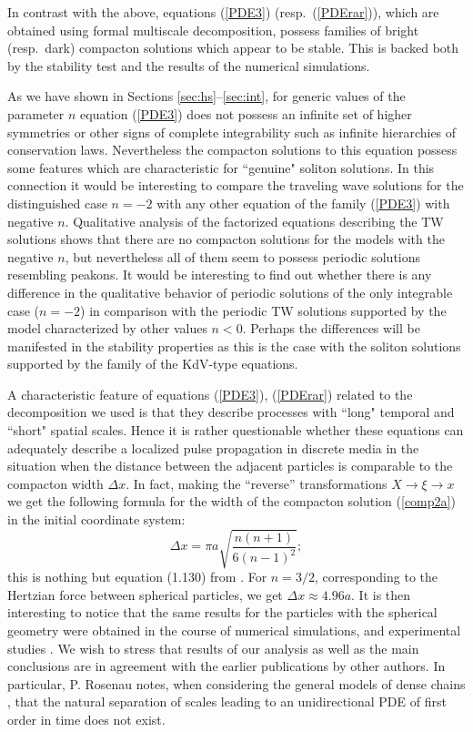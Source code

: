 \documentclass[12pt]{article}
\begin{document}
In contrast with the above, equations  (\ref{PDE3}) (resp.\ (\ref{PDErar})), which are obtained using formal multiscale decomposition,
possess families  of bright (resp.\ dark) compacton solutions which appear to be stable. This is backed both by the stability test and the results of the numerical simulations.

As we have shown in Sections \ref{sec:hs}--\ref{sec:int}, for generic values of the parameter $n$ equation (\ref{PDE3}) does not possess an infinite set of higher symmetries or other signs of complete integrability such as infinite hierarchies of conservation laws.  Nevertheless the compacton solutions to this equation possess some features which  are characteristic for ``genuine"  soliton solutions. In this connection it would be interesting to compare the traveling wave solutions for the distinguished case $n=-2$ with any other  equation of the family (\ref{PDE3}) with negative $n$.
Qualitative analysis of the factorized equations describing the TW solutions shows that there are no
compacton solutions for the models with the negative $n$, but nevertheless all of them seem to possess periodic solutions resembling peakons. It would be interesting to find out whether there is any difference in the qualitative behavior of periodic solutions of the only integrable case ($n=-2$) in comparison with the periodic TW solutions supported by the model characterized by other values $n<0$. Perhaps the differences will be manifested in the stability  properties as this is the case with the soliton solutions supported by the family of the KdV-type equations.


A characteristic feature of equations (\ref{PDE3}), (\ref{PDErar}) related to the decomposition we used is that they describe processes
with ``long" temporal and  ``short" spatial scales. Hence it is rather questionable whether these equations can adequately describe a localized pulse propagation in discrete media in the situation when the distance between the adjacent  particles is comparable to the compacton width $\Delta x$. In fact, making the ``reverse'' transformations $X\rightarrow\xi\rightarrow x$ we get the following formula for the width of the compacton solution (\ref{comp2a}) in the initial coordinate system:
\[
\Delta x= \pi a \sqrt{\frac{n (n+1)}{6 (n-1)^2}};
\]
this is nothing but equation (1.130) from \cite{Nester_02}.
For $n=3/2$, corresponding to the Hertzian force between spherical particles, we get $\Delta x\approx 4.96 a$. It is then interesting to notice that the same results for the particles with the spherical geometry were obtained in the course of numerical simulations,  and experimental studies \cite{Nester_83, NestLaz_85, Nester_94,Nester_95,Vengr}. We wish to stress that  results of our analysis as well as the main conclusions are in agreement with the earlier publications by other authors. In particular,  P. Rosenau notes, when  considering the general models of dense chains \cite{Rosenau_06}, that the natural separation of scales leading to an unidirectional PDE of first order in time does not exist.
\end{document}
